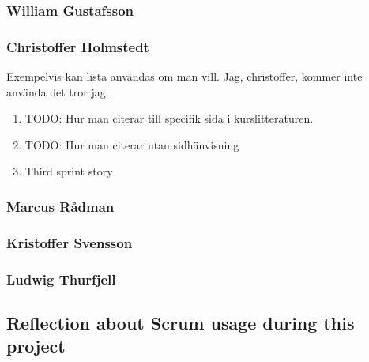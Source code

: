 \subsubsection{William Gustafsson}
\subsubsection{Christoffer Holmstedt}
Exempelvis kan lista användas om man vill. Jag, christoffer, kommer inte använda det tror jag.
\begin{enumerate}
\item TODO: Hur man citerar till specifik sida i kurslitteraturen. \cite[p.~42]{kniberg07}
\item TODO: Hur man citerar utan sidhänvisning \cite{kniberg07}
\item Third sprint story
\end{enumerate}
\subsubsection{Marcus Rådman}
\subsubsection{Kristoffer Svensson}
\subsubsection{Ludwig Thurfjell}
\subsection{Reflection about Scrum usage during this project}
